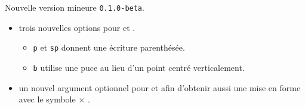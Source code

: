 Nouvelle version mineure \verb+0.1.0-beta+.

\begin{itemize}[itemsep=.5em]
    \item {}
          trois nouvelles options pour  et .
    \begin{itemize}[itemsep=.5em]
        \item \verb+p+ et \verb+sp+ donnent une écriture parenthésée.

        \item \verb+b+ utilise une puce au lieu d'un point centré verticalement.
    \end{itemize}


    \item {}
          un nouvel argument optionnel pour  et  afin d'obtenir aussi une mise en forme avec le symbole $\times$ .
\end{itemize}

\separation
